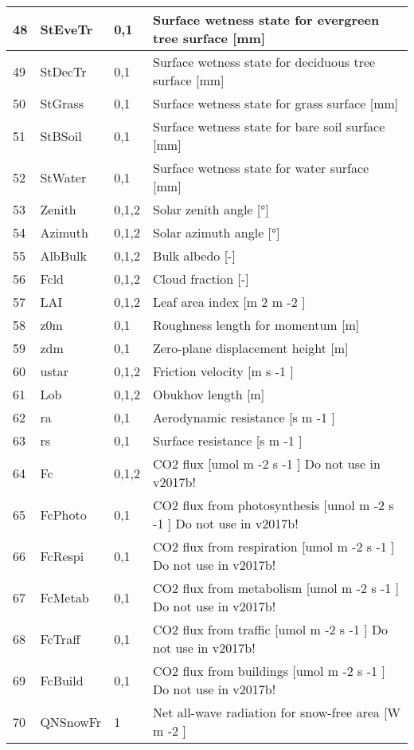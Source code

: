 \documentclass[letterpaper,10pt,english]{sphinxmanual}
\begin{document}
\begin{savenotes}
\begin{longtable}{|l|l|l|l|}
48
&
StEveTr
&
0,1
&
Surface wetness state for evergreen tree surface {[}mm{]}
\\
\hline
49
&
StDecTr
&
0,1
&
Surface wetness state for deciduous tree surface {[}mm{]}
\\
\hline
50
&
StGrass
&
0,1
&
Surface wetness state for grass surface {[}mm{]}
\\
\hline
51
&
StBSoil
&
0,1
&
Surface wetness state for bare soil surface {[}mm{]}
\\
\hline
52
&
StWater
&
0,1
&
Surface wetness state for water surface {[}mm{]}
\\
\hline
53
&
Zenith
&
0,1,2
&
Solar zenith angle {[}°{]}
\\
\hline
54
&
Azimuth
&
0,1,2
&
Solar azimuth angle {[}°{]}
\\
\hline
55
&
AlbBulk
&
0,1,2
&
Bulk albedo {[}-{]}
\\
\hline
56
&
Fcld
&
0,1,2
&
Cloud fraction {[}-{]}
\\
\hline
57
&
LAI
&
0,1,2
&
Leaf area index {[}m 2 m -2 {]}
\\
\hline
58
&
z0m
&
0,1
&
Roughness length for momentum {[}m{]}
\\
\hline
59
&
zdm
&
0,1
&
Zero-plane displacement height {[}m{]}
\\
\hline
60
&
ustar
&
0,1,2
&
Friction velocity {[}m s -1 {]}
\\
\hline
61
&
Lob
&
0,1,2
&
Obukhov length {[}m{]}
\\
\hline
62
&
ra
&
0,1
&
Aerodynamic resistance {[}s m -1 {]}
\\
\hline
63
&
rs
&
0,1
&
Surface resistance {[}s m -1 {]}
\\
\hline
64
&
Fc
&
0,1,2
&
CO2 flux {[}umol m -2 s -1 {]} Do not use in v2017b!
\\
\hline
65
&
FcPhoto
&
0,1
&
CO2 flux from photosynthesis {[}umol m -2 s -1 {]} Do not use in v2017b!
\\
\hline
66
&
FcRespi
&
0,1
&
CO2 flux from respiration {[}umol m -2 s -1 {]} Do not use in v2017b!
\\
\hline
67
&
FcMetab
&
0,1
&
CO2 flux from metabolism {[}umol m -2 s -1 {]} Do not use in v2017b!
\\
\hline
68
&
FcTraff
&
0,1
&
CO2 flux from traffic {[}umol m -2 s -1 {]} Do not use in v2017b!
\\
\hline
69
&
FcBuild
&
0,1
&
CO2 flux from buildings {[}umol m -2 s -1 {]} Do not use in v2017b!
\\
\hline
70
&
QNSnowFr
&
1
&
Net all-wave radiation for snow-free area {[}W m -2 {]}

\end{longtable}
\end{savenotes}
\end{document}
